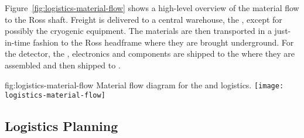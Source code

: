 
 
Figure~\ref{fig:logistics-material-flow} shows a high-level overview of the material flow to the Ross shaft. Freight is delivered to a central warehouse, the , except for possibly the cryogenic equipment. 
 The materials are then transported in a just-in-time fashion to the Ross headframe where they are brought underground. For the detector, the , electronics and  components %
 are shipped to the  where they are assembled and then shipped %
 to .
 
\begin{dunefigure}{fig:logistics-material-flow}
  {Material flow diagram for the  and  logistics.}
 \texttt{[image: logistics-material-flow]}
\end{dunefigure}


\subsection{Logistics Planning}
\label{sec:fdsp-tc-logPln}

